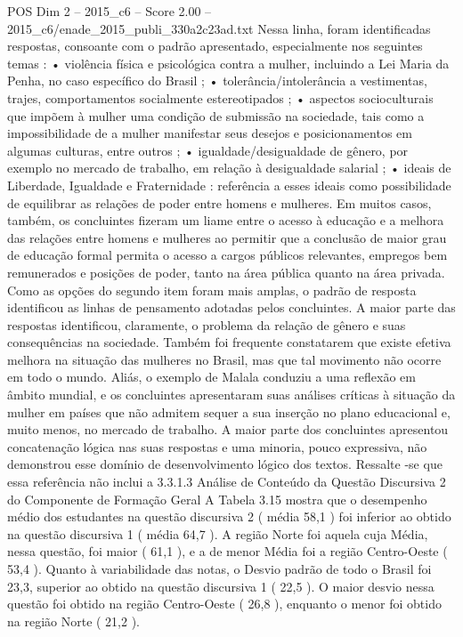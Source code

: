 \begin{textsample}{POS Dim 2 – 2015\_c6 – Score 2.00 – 2015\_c6/enade\_2015\_publi\_330a2c23ad.txt}
Nessa linha, foram identificadas respostas, consoante com o padrão apresentado, especialmente nos seguintes temas : • violência física e psicológica contra a mulher, incluindo a Lei Maria da Penha, no caso específico do Brasil ; • tolerância/intolerância a vestimentas, trajes, comportamentos socialmente estereotipados ; • aspectos socioculturais que impõem à mulher uma condição de submissão na sociedade, tais como a impossibilidade de a mulher manifestar seus desejos e posicionamentos em algumas culturas, entre outros ; • igualdade/desigualdade de gênero, por exemplo no mercado de trabalho, em relação à desigualdade salarial ; • ideais de Liberdade, Igualdade e Fraternidade : referência a esses ideais como possibilidade de equilibrar as relações de poder entre homens e mulheres.
Em muitos casos, também, os concluintes fizeram um liame entre o acesso à educação e a melhora das relações entre homens e mulheres ao permitir que a conclusão de maior grau de educação formal permita o acesso a cargos públicos relevantes, empregos bem remunerados e posições de poder, tanto na área pública quanto na área privada.
Como as opções do segundo item foram mais amplas, o padrão de resposta identificou as linhas de pensamento adotadas pelos concluintes.
A maior parte das respostas identificou, claramente, o problema da relação de gênero e suas consequências na sociedade.
Também foi frequente constatarem que existe efetiva melhora na situação das mulheres no Brasil, mas que tal movimento não ocorre em todo o mundo.
Aliás, o exemplo de Malala conduziu a uma reflexão em âmbito mundial, e os concluintes apresentaram suas análises críticas à situação da mulher em países que não admitem sequer a sua inserção no plano educacional e, muito menos, no mercado de trabalho.
A maior parte dos concluintes apresentou concatenação lógica nas suas respostas e uma minoria, pouco expressiva, não demonstrou esse domínio de desenvolvimento lógico dos textos.
Ressalte -se que essa referência não inclui a 3.3.1.3 Análise de Conteúdo da Questão Discursiva 2 do Componente de Formação Geral A Tabela 3.15 mostra que o desempenho médio dos estudantes na questão discursiva 2 ( média 58,1 ) foi inferior ao obtido na questão discursiva 1 ( média 64,7 ).
A região Norte foi aquela cuja Média, nessa questão, foi maior ( 61,1 ), e a de menor Média foi a região Centro-Oeste ( 53,4 ).
Quanto à variabilidade das notas, o Desvio padrão de todo o Brasil foi 23,3, superior ao obtido na questão discursiva 1 ( 22,5 ).
O maior desvio nessa questão foi obtido na região Centro-Oeste ( 26,8 ), enquanto o menor foi obtido na região Norte ( 21,2 ).

\end{textsample}
